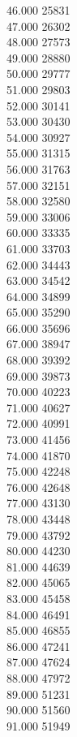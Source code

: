{ 46.000	25831 \\
 47.000	26302 \\
 48.000	27573 \\
 49.000	28880 \\
 50.000	29777 \\
 51.000	29803 \\
 52.000	30141 \\
 53.000	30430 \\
 54.000	30927 \\
 55.000	31315 \\
 56.000	31763 \\
 57.000	32151 \\
 58.000	32580 \\
 59.000	33006 \\
 60.000	33335 \\
 61.000	33703 \\
 62.000	34443 \\
 63.000	34542 \\
 64.000	34899 \\
 65.000	35290 \\
 66.000	35696 \\
 67.000	38947 \\
 68.000	39392 \\
 69.000	39873 \\
 70.000	40223 \\
 71.000	40627 \\
 72.000	40991 \\
 73.000	41456 \\
 74.000	41870 \\
 75.000	42248 \\
 76.000	42648 \\
 77.000	43130 \\
 78.000	43448 \\
 79.000	43792 \\
 80.000	44230 \\
 81.000	44639 \\
 82.000	45065 \\
 83.000	45458 \\
 84.000	46491 \\
 85.000	46855 \\
 86.000	47241 \\
 87.000	47624 \\
 88.000	47972 \\
 89.000	51231 \\
 90.000	51560 \\
 91.000	51949 \\
}
